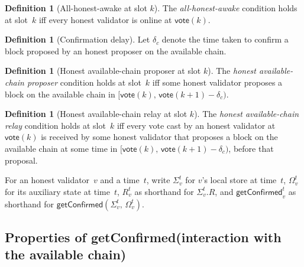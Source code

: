 \documentclass{article}
\newcommand{\syncer}{\mathsf{syncer}}
\newcommand{\start}{\mathsf{start}}
\newcommand{\vote}{\mathsf{vote}}
\newcommand{\getConfirmed}{\textsf{getConfirmed}\xspace}
\theoremstyle{plain}
\newtheorem{property}[theorem]{Property}
\theoremstyle{definition}
\newtheorem{definition}[theorem]{Definition}
\theoremstyle{remark}
\newcommand{\GST}{\ensuremath{\mathsf{GST}}}
\newcommand{\HAP}{honest available-chain proposer\xspace}
\newcommand{\HAR}{honest available-chain relay\xspace}
\newcommand{\AHA}{all-honest-awake\xspace}
\begin{document}
\begin{definition}[All-honest-awake at slot $k$]\label{rev:def:all-honest-awake}
The \emph{\AHA} condition holds at slot~$k$ iff every honest validator is online at $\vote(k)$.
\end{definition}

\begin{definition}[Confirmation delay]\label{rev:def:confirmation-delay}
Let $\delta_c$ denote the time taken to confirm a block proposed by an honest proposer on the available chain.
\end{definition}

\begin{definition}[Honest available-chain proposer at slot $k$]\label{rev:def:honest-available-chain-proposer}
The \emph{\HAP} condition holds at slot~$k$ iff some honest validator proposes a block on the available chain in $[\vote(k),\, \vote(k+1) - \delta_c)$.
\end{definition}

\begin{definition}[Honest available-chain relay at slot $k$]\label{rev:def:honest-available-chain-relay}
The \emph{\HAR} condition holds at slot~$k$ iff every vote cast by an honest validator at $\vote(k)$ is received by some honest validator that proposes a block on the available chain at some time in $[\vote(k),\, \vote(k+1) - \delta_c)$, before that proposal.
\end{definition}

For an honest validator~$v$ and a time~$t$, write $\Sigma_v^t$ for $v$'s local store at time~$t$, $\Omega_v^t$ for its auxiliary state at time~$t$, $R_v^t$ as shorthand for $\Sigma_v^t.R$, and $\getConfirmed_v^t$ as shorthand for $\getConfirmed(\Sigma_v^t,\, \Omega_v^t)$.


\subsection{Properties of \getConfirmed (interaction with the available chain)}\label{rev:sec:getConfirmed-properties}
\end{document}
